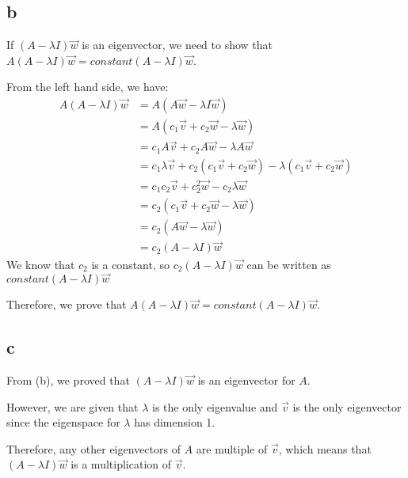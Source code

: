 \documentclass[10pt]{article}
\begin{document}
\subsection*{b}
\noindent If $(A-\lambda I)\Vec{w}$ is an eigenvector, we need to show that $A(A-\lambda I)\Vec{w} = constant (A- \lambda I) \Vec{w}$. \par
\noindent From the left hand side, we have:
\begin{align*}
    A(A-\lambda I)\Vec{w}
    &= A(A\Vec{w}-\lambda I\Vec{w}) \\
    &= A(c_1 \Vec{v} + c_2 \Vec{w} - \lambda \Vec{w}) \\
    &= c_1 A\Vec{v} + c_2 A\Vec{w} - \lambda A\Vec{w} \\
    &= c_1\lambda \Vec{v} + c_2(c_1\Vec{v} + c_2\Vec{w}) -\lambda (c_1\Vec{v} + c_2\Vec{w}) \\
    &= c_1c_2 \Vec{v} + c_2^2 \Vec{w} - c_2\lambda \Vec{w} \\
    &= c_2 (c_1\Vec{v} + c_2\Vec{w} - \lambda \Vec{w}) \\
    &= c_2 (A\Vec{w}- \lambda \Vec{w} ) \\
    &= c_2 (A -\lambda I)\Vec{w}
\end{align*}
\noindent We know that $c_2$ is a constant, so $c_2 (A -\lambda I)\Vec{w}$ can be written as $ constant (A -\lambda I)\Vec{w}$ \par
\noindent Therefore, we prove that $A(A-\lambda I)\Vec{w} = constant (A- \lambda I) \Vec{w}$.

\subsection*{c}
\noindent From (b), we proved that $(A-\lambda I)\Vec{w}$ is an eigenvector for $A$. \par
\noindent However, we are given that $\lambda$ is the only eigenvalue and $\Vec{v}$ is the only eigenvector since the eigenspace for $\lambda$ has dimension 1. \par
\noindent Therefore, any other eigenvectors of $A$ are multiple of $\Vec{v}$, which means that $(A-\lambda I)\Vec{w}$ is a multiplication of $\Vec{v}$.
\end{document}
